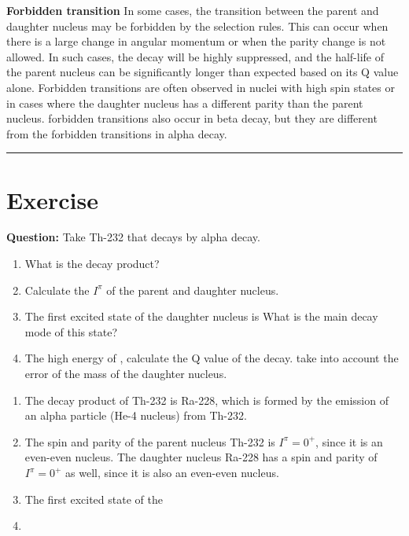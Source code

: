 \documentclass[11pt,a4paper]{article}
\begin{document}
\vspace{0.5cm}
\textbf{Forbidden transition}
In some cases, the transition between the parent and daughter nucleus may be forbidden by the selection rules. This can occur when there is a large change in angular momentum or when the parity change is not allowed. In such cases, the decay will be highly suppressed, and the half-life of the parent nucleus can be significantly longer than expected based on its Q value alone. Forbidden transitions are often observed in nuclei with high spin states or in cases where the daughter nucleus has a different parity than the parent nucleus.
forbidden transitions also occur in beta decay, but they are different from the forbidden transitions in alpha decay.

\hrule
\section{Exercise}
\textbf{Question:}
Take Th-232 that decays by alpha decay.
\begin{enumerate}
    \item What is the decay product?
    \item Calculate the $I^{\pi}$ of the parent and daughter nucleus.
    \item The first excited state of the daughter nucleus is  What is the main decay mode of this state?
    \item The high energy of  , calculate the Q value of the decay. take into account the error of the mass of the daughter nucleus.
\end{enumerate}
\begin{enumerate}
    \item The decay product of Th-232 is Ra-228, which is formed by the emission of an alpha particle (He-4 nucleus) from Th-232.
    \item The spin and parity of the parent nucleus Th-232 is $I^{\pi} = 0^+$, since it is an even-even nucleus. The daughter nucleus Ra-228 has a spin and parity of $I^{\pi} = 0^+$ as well, since it is also an even-even nucleus.
    \item The first excited state of the
    \item
\end{enumerate}
\end{document}
